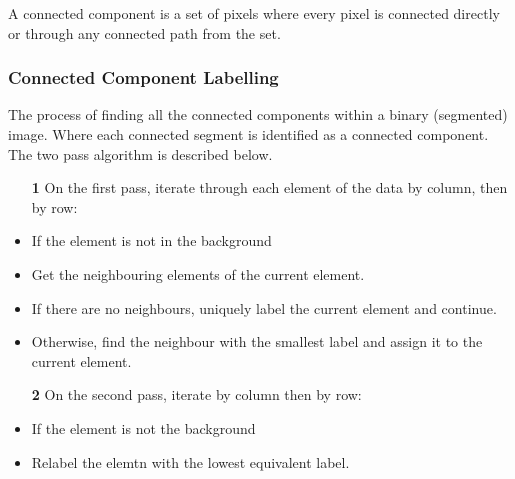 A connected component is a set of pixels where every pixel is connected directly or through any connected path from the set.

\subsubsection{Connected Component Labelling}
The process of finding all the connected components within a binary (segmented) image. Where each connected segment is identified as a connected component.
\\

\noindent The two pass algorithm is described below.

\begin{itemize}
    \itemsep0em
    \item [\textbf{1}] On the first pass, iterate through each element of the data by column, then by row:
    \setlength{\itemindent}{.15in}
    \item If the element is not in the background
    \item Get the neighbouring elements of the current element.
    \item If there are no neighbours, uniquely label the current element and continue.
    \item Otherwise, find the neighbour with the smallest label and assign it to the current element.
    \setlength{\itemindent}{0in}
    \item [\textbf{2}] On the second pass, iterate by column then by row:
    \setlength{\itemindent}{.15in}
    \item If the element is not the background
    \item Relabel the elemtn with the lowest equivalent label.
    
\end{itemize}
